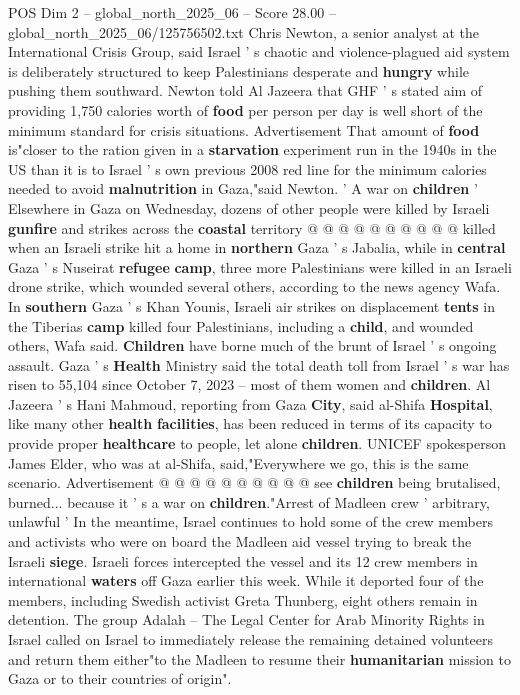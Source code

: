 \begin{textsample}{POS Dim 2 – global\_north\_2025\_06 – Score 28.00 – global\_north\_2025\_06/125756502.txt}
Chris Newton, a senior analyst at the International Crisis Group, said Israel ' s chaotic and violence-plagued aid system is deliberately structured to keep Palestinians desperate and \textbf{hungry} while pushing them southward.
Newton told Al Jazeera that GHF ' s stated aim of providing 1,750 calories worth of \textbf{food} per person per day is well short of the minimum standard for crisis situations.
Advertisement That amount of \textbf{food} is"closer to the ration given in a \textbf{starvation} experiment run in the 1940s in the US than it is to Israel ' s own previous 2008 red line for the minimum calories needed to avoid \textbf{malnutrition} in Gaza,"said Newton. ' A war on \textbf{children} ' Elsewhere in Gaza on Wednesday, dozens of other people were killed by Israeli \textbf{gunfire} and strikes across the \textbf{coastal} territory @ @ @ @ @ @ @ @ @ @ killed when an Israeli strike hit a home in \textbf{northern} Gaza ' s Jabalia, while in \textbf{central} Gaza ' s Nuseirat \textbf{refugee} \textbf{camp}, three more Palestinians were killed in an Israeli drone strike, which wounded several others, according to the news agency Wafa.
In \textbf{southern} Gaza ' s Khan Younis, Israeli air strikes on displacement \textbf{tents} in the Tiberias \textbf{camp} killed four Palestinians, including a \textbf{child}, and wounded others, Wafa said. \textbf{Children} have borne much of the brunt of Israel ' s ongoing assault.
Gaza ' s \textbf{Health} Ministry said the total death toll from Israel ' s war has risen to 55,104 since October 7, 2023 -- most of them women and \textbf{children}.
Al Jazeera ' s Hani Mahmoud, reporting from Gaza \textbf{City}, said al-Shifa \textbf{Hospital}, like many other \textbf{health} \textbf{facilities}, has been reduced in terms of its capacity to provide proper \textbf{healthcare} to people, let alone \textbf{children}.
UNICEF spokesperson James Elder, who was at al-Shifa, said,"Everywhere we go, this is the same scenario.
Advertisement @ @ @ @ @ @ @ @ @ @ see \textbf{children} being brutalised, burned... because it ' s a war on \textbf{children}."Arrest of Madleen crew ' arbitrary, unlawful ' In the meantime, Israel continues to hold some of the crew members and activists who were on board the Madleen aid vessel trying to break the Israeli \textbf{siege}.
Israeli forces intercepted the vessel and its 12 crew members in international \textbf{waters} off Gaza earlier this week.
While it deported four of the members, including Swedish activist Greta Thunberg, eight others remain in detention.
The group Adalah -- The Legal Center for Arab Minority Rights in Israel called on Israel to immediately release the remaining detained volunteers and return them either"to the Madleen to resume their \textbf{humanitarian} mission to Gaza or to their countries of origin".

\end{textsample}
